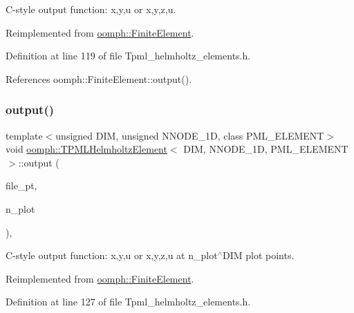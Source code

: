 C-\/style output function\+: x,y,u or x,y,z,u. 



Reimplemented from \hyperlink{classoomph_1_1FiniteElement_a72cddd09f8ddbee1a20a1ff404c6943e}{oomph\+::\+Finite\+Element}.



Definition at line 119 of file Tpml\+\_\+helmholtz\+\_\+elements.\+h.



References oomph\+::\+Finite\+Element\+::output().

\mbox{\label{classoomph_1_1TPMLHelmholtzElement_afd6b59e8e8c67ab656038b46ea573900}} 
\subsubsection{\texorpdfstring{output()}{output()}\hspace{0.1cm}{\footnotesize\ttfamily [4/4]}}
{\footnotesize\ttfamily template$<$unsigned D\+IM, unsigned N\+N\+O\+D\+E\+\_\+1D, class P\+M\+L\+\_\+\+E\+L\+E\+M\+E\+NT$>$ \\
void \hyperlink{classoomph_1_1TPMLHelmholtzElement}{oomph\+::\+T\+P\+M\+L\+Helmholtz\+Element}$<$ D\+IM, N\+N\+O\+D\+E\+\_\+1D, P\+M\+L\+\_\+\+E\+L\+E\+M\+E\+NT $>$\+::output (\begin{DoxyParamCaption}\item[{F\+I\+LE $\ast$}]{file\+\_\+pt,  }\item[{const unsigned \&}]{n\+\_\+plot }\end{DoxyParamCaption})\hspace{0.3cm}{\ttfamily [inline]}, {\ttfamily [virtual]}}



C-\/style output function\+: x,y,u or x,y,z,u at n\+\_\+plot$^\wedge$\+D\+IM plot points. 



Reimplemented from \hyperlink{classoomph_1_1FiniteElement_adfaee690bb0608f03320eeb9d110d48c}{oomph\+::\+Finite\+Element}.



Definition at line 127 of file Tpml\+\_\+helmholtz\+\_\+elements.\+h.



